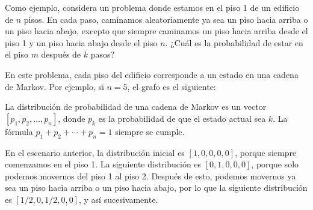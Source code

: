 Como ejemplo, considera un problema
donde estamos en el piso 1 de un edificio de $n$ pisos.
En cada paso, caminamos aleatoriamente ya sea un piso
hacia arriba o un piso hacia abajo, excepto que siempre
caminamos un piso hacia arriba desde el piso 1 y un piso hacia abajo
desde el piso $n$.
¿Cuál es la probabilidad de estar en el piso $m$
después de $k$ pasos?

En este problema, cada piso del edificio
corresponde a un estado en una cadena de Markov.
Por ejemplo, si $n=5$, el grafo es el siguiente:

\begin{center}
\end{center}

La distribución de probabilidad
de una cadena de Markov es un vector
$[p_1,p_2,\ldots,p_n]$, donde $p_k$ es la
probabilidad de que el estado actual sea $k$.
La fórmula $p_1+p_2+\cdots+p_n=1$ siempre se cumple.

En el escenario anterior, la distribución inicial es
$[1,0,0,0,0]$, porque siempre comenzamos en el piso 1.
La siguiente distribución es $[0,1,0,0,0]$,
porque solo podemos movernos del piso 1 al piso 2.
Después de esto, podemos movernos ya sea un piso hacia arriba
o un piso hacia abajo, por lo que la siguiente distribución es
$[1/2,0,1/2,0,0]$, y así sucesivamente.

